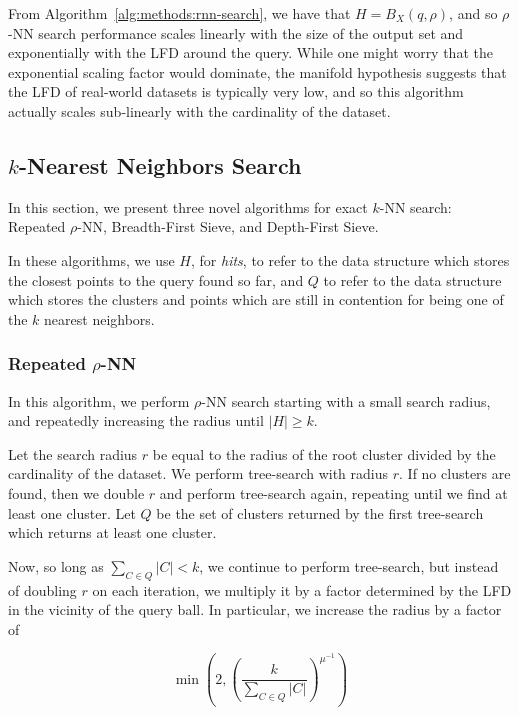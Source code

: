 From Algorithm~\ref{alg:methods:rnn-search}, we have that $H = B_X(q, \rho)$, and so $\rho$-NN search performance scales linearly with the size of the output set and exponentially with the LFD around the query.
While one might worry that the exponential scaling factor would dominate, the manifold hypothesis suggests that the LFD of real-world datasets is typically very low, and so this algorithm actually scales sub-linearly with the cardinality of the dataset.


\subsection{\texorpdfstring{$k$}{k}-Nearest Neighbors Search}
\label{sec:methods:knn-search}

In this section, we present three novel algorithms for exact $k$-NN search:
Repeated $\rho$-NN, Breadth-First Sieve, and Depth-First Sieve.

In these algorithms, we use $H$, for \textit{hits}, to refer to the data structure which stores the closest points to the query found so far, and $Q$ to refer to the data structure which stores the clusters and points which are still in contention for being one of the $k$ nearest neighbors.


\subsubsection{Repeated \texorpdfstring{$\rho$}{p}-NN}
\label{sec:methods:knn-search:repeated-rnn}

In this algorithm, we perform $\rho$-NN search starting with a small search radius, and repeatedly increasing the radius until $|H| \geq k$.

Let the search radius $r$ be equal to the radius of the root cluster divided by the cardinality of the dataset.
We perform tree-search with radius $r$.
If no clusters are found, then we double $r$ and perform tree-search again, repeating until we find at least one cluster.
Let $Q$ be the set of clusters returned by the first tree-search which returns at least one cluster.

Now, so long as $\sum_{C \in Q} |C| < k$, we continue to perform tree-search, but instead of doubling $r$ on each iteration, we multiply it by a factor determined by the LFD in the vicinity of the query ball.
In particular, we increase the radius by a factor of

\begin{equation}
    \min \left(2, \left( {\frac{k}{\sum_{C \in Q} |C|}} \right)^{\mu^{-1}} \right)
    \label{eq:methods:repeated-rnn-factor}
\end{equation}


